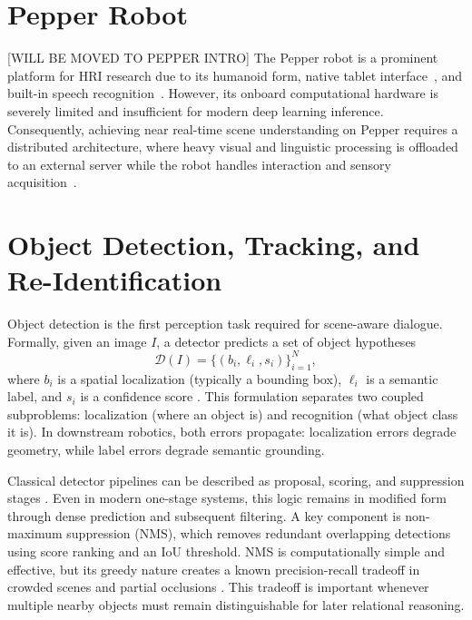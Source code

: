 \section{Pepper Robot}



[WILL BE MOVED TO PEPPER INTRO]
The Pepper robot is a prominent platform for HRI research due to its humanoid form, native tablet interface~\cite{softbank_peppers_tablet_2026}, and built-in speech recognition~\cite{softbank_alspeechrecognition_2026}. However, its onboard computational hardware is severely limited and insufficient for modern deep learning inference. Consequently, achieving near real-time scene understanding on Pepper requires a distributed architecture, where heavy visual and linguistic processing is offloaded to an external server while the robot handles interaction and sensory acquisition~\cite{reyes_near_2018, trinquet_future_2025, brad_retrieval-augmented_2025}.


\section{Object Detection, Tracking, and Re-Identification}

  Object detection is the first perception task required for scene-aware dialogue. Formally, given an image \(I\), a detector predicts a set of object hypotheses
  \[
  \mathcal{D}(I)=\{(b_i,\ell_i,s_i)\}_{i=1}^{N},
  \]
  where \(b_i\) is a spatial localization (typically a bounding box), \(\ell_i\) is a semantic label, and \(s_i\) is a confidence score \cite[Part XIII]{foundationsCVbook}. This formulation separates two
  coupled subproblems: localization (where an object is) and recognition (what object class it is). In downstream robotics, both errors propagate: localization errors degrade geometry, while label errors
  degrade semantic grounding.

  Classical detector pipelines can be described as proposal, scoring, and suppression stages \cite{foundationsCVbook}. Even in modern one-stage systems, this logic remains in modified form through dense
  prediction and subsequent filtering. A key component is non-maximum suppression (NMS), which removes redundant overlapping detections using score ranking and an IoU threshold. NMS is computationally
  simple and effective, but its greedy nature creates a known precision-recall tradeoff in crowded scenes and partial occlusions \cite{hosang_learning_2017}. This tradeoff is important whenever multiple
  nearby objects must remain distinguishable for later relational reasoning.

